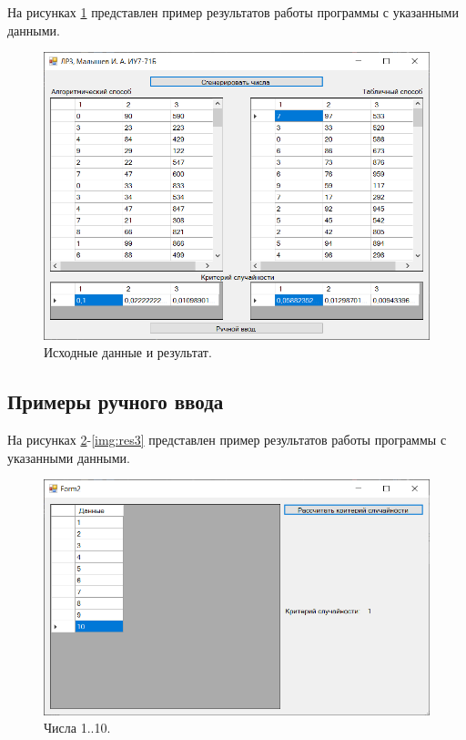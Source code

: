 \documentclass[12pt]{report}
\begin{document}
На рисунках \ref{img:res} представлен пример результатов работы программы с указанными данными.

\begin{figure}[H]
	\begin{center}
		\includegraphics[scale=0.8]{imgs/genres.png}
	\end{center}
	\caption{Исходные данные и результат.}
	\label{img:res}
\end{figure}

\subsection{Примеры ручного ввода}

На рисунках \ref{img:res1}-\ref{img:res3} представлен пример результатов работы программы с указанными данными.

\begin{figure}[H]
	\begin{center}
		\includegraphics[scale=0.8]{imgs/res1.png}
	\end{center}
	\caption{Числа 1..10.}
	\label{img:res1}
\end{figure}
\end{document}
